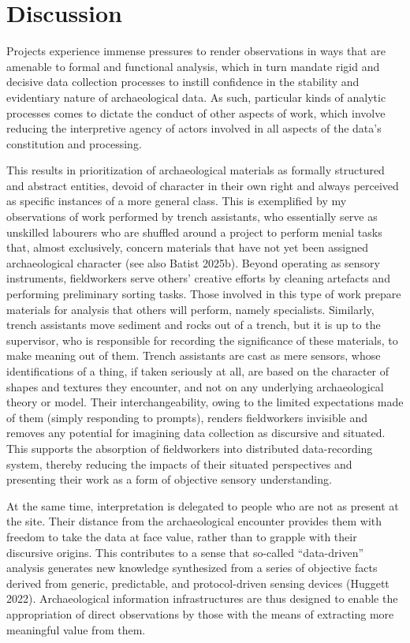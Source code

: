 \documentclass[
  canadian,
]{article}
\begin{document}
\section{Discussion}\label{discussion}

Projects experience immense pressures to render observations in ways
that are amenable to formal and functional analysis, which in turn
mandate rigid and decisive data collection processes to instill
confidence in the stability and evidentiary nature of archaeological
data. As such, particular kinds of analytic processes comes to dictate
the conduct of other aspects of work, which involve reducing the
interpretive agency of actors involved in all aspects of the data's
constitution and processing.

This results in prioritization of archaeological materials as formally
structured and abstract entities, devoid of character in their own right
and always perceived as specific instances of a more general class. This
is exemplified by my observations of work performed by trench
assistants, who essentially serve as unskilled labourers who are
shuffled around a project to perform menial tasks that, almost
exclusively, concern materials that have not yet been assigned
archaeological character (see also Batist 2025b). Beyond operating as
sensory instruments, fieldworkers serve others' creative efforts by
cleaning artefacts and performing preliminary sorting tasks. Those
involved in this type of work prepare materials for analysis that others
will perform, namely specialists. Similarly, trench assistants move
sediment and rocks out of a trench, but it is up to the supervisor, who
is responsible for recording the significance of these materials, to
make meaning out of them. Trench assistants are cast as mere sensors,
whose identifications of a thing, if taken seriously at all, are based
on the character of shapes and textures they encounter, and not on any
underlying archaeological theory or model. Their interchangeability,
owing to the limited expectations made of them (simply responding to
prompts), renders fieldworkers invisible and removes any potential for
imagining data collection as discursive and situated. This supports the
absorption of fieldworkers into distributed data-recording system,
thereby reducing the impacts of their situated perspectives and
presenting their work as a form of objective sensory understanding.

At the same time, interpretation is delegated to people who are not as
present at the site. Their distance from the archaeological encounter
provides them with freedom to take the data at face value, rather than
to grapple with their discursive origins. This contributes to a sense
that so-called ``data-driven'' analysis generates new knowledge
synthesized from a series of objective facts derived from generic,
predictable, and protocol-driven sensing devices (Huggett 2022).
Archaeological information infrastructures are thus designed to enable
the appropriation of direct observations by those with the means of
extracting more meaningful value from them.
\end{document}
